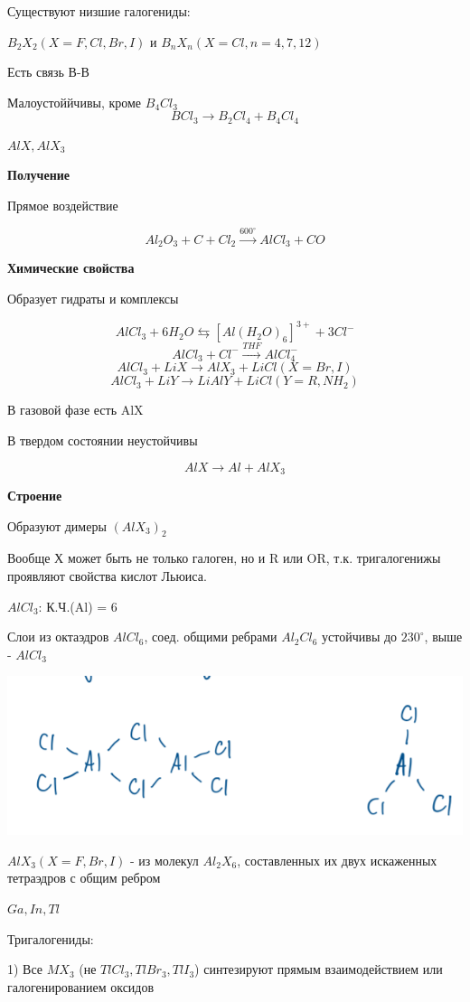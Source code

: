 \documentclass[14pt,a4paper]{scrartcl}
\begin{document}
Существуют низшие галогениды:

$B_2X_2 (X=F,Cl,Br,I)$ и $B_nX_n (X = Cl, n = 4,7,12)$

Есть связь В-В

Малоустоййчивы, кроме $B_4Cl_3$
$$BCl_3 \rightarrow B_2Cl_4 + B_4Cl_4$$

$AlX, AlX_3$

\textbf{Получение}

Прямое воздействие

$$Al_2O_3 + C + Cl_2 \xrightarrow{600^{\circ}} AlCl_3 + CO$$

\textbf{Химические свойства}

Образует гидраты и комплексы 

$$AlCl_3 + 6H_2O \leftrightarrows [Al(H_2O)_6]^{3+} + 3Cl^-$$
$$AlCl_3 + Cl^- \xrightarrow{THF} AlCl_4^-$$
$$AlCl_3 + LiX \rightarrow AlX_3 + LiCl (X = Br, I)$$
$$AlCl_3 + LiY \rightarrow LiAlY + LiCl (Y=R,NH_2)$$

В газовой фазе есть AlX

В твердом состоянии неустойчивы

$$AlX \rightarrow Al + AlX_3$$

\textbf{Строение}

Образуют димеры $(AlX_3)_2$

Вообще Х может быть не только галоген, но и R или OR, т.к. тригалогенижы проявляют свойства кислот Льюиса.

$AlCl_3$:  К.Ч.(Al) = 6

Слои из  октаэдров $AlCl_6$, соед. общими ребрами $Al_2Cl_6$ устойчивы до $230^{\circ}$, выше - $AlCl_3$ 

\includegraphics{11v12.png}

$AlX_3 (X= F, Br, I)$ - из молекул $Al_2X_6$, составленных их двух искаженных тетраэдров с общим ребром


$Ga, In, Tl$

Тригалогениды:

1) Все $MX_3$ (не $TlCl_3, TlBr_3, TlI_3$) синтезируют прямым взаимодействием или галогенированием оксидов
\end{document}
